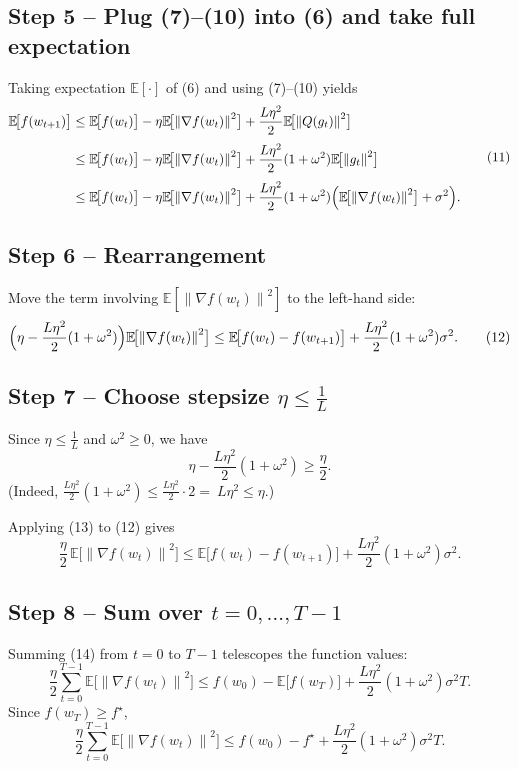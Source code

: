\documentclass{article}
\newcommand{\E}{\mathbb{E}}
\newcommand{\norm}[1]{\left\lVert#1\right\rVert}
\begin{document}
\subsection*{Step 5 – Plug (7)–(10) into (6) and take full expectation}
Taking expectation $\E[\cdot]$ of (6) and using (7)–(10) yields
\[
\begin{aligned}
\E\!\bigl[f(w_{t+1})\bigr]
&\le \E\!\bigl[f(w_{t})\bigr]
   -\eta\E\!\bigl[\norm{\nabla f(w_{t})}^{2}\bigr]
   +\frac{L\eta^{2}}{2}\E\!\bigl[\norm{Q(g_{t})}^{2}\bigr] \\[1mm]
&\le \E\!\bigl[f(w_{t})\bigr]
   -\eta\E\!\bigl[\norm{\nabla f(w_{t})}^{2}\bigr]
   +\frac{L\eta^{2}}{2}(1+\omega^{2})\E\!\bigl[\norm{g_{t}}^{2}\bigr] \\[1mm]
&\le \E\!\bigl[f(w_{t})\bigr]
   -\eta\E\!\bigl[\norm{\nabla f(w_{t})}^{2}\bigr]
   +\frac{L\eta^{2}}{2}(1+\omega^{2})\Bigl(\E\!\bigl[\norm{\nabla f(w_{t})}^{2}\bigr]+\sigma^{2}\Bigr).
\end{aligned}
\tag{11}
\]

\subsection*{Step 6 – Rearrangement}
Move the term involving $\E[\norm{\nabla f(w_{t})}^{2}]$ to the left-hand side:
\[
\Bigl(\eta-\frac{L\eta^{2}}{2}(1+\omega^{2})\Bigr)
\E\!\bigl[\norm{\nabla f(w_{t})}^{2}\bigr]
\le \E\!\bigl[f(w_{t})-f(w_{t+1})\bigr]
      +\frac{L\eta^{2}}{2}(1+\omega^{2})\sigma^{2}. \tag{12}
\]

\subsection*{Step 7 – Choose stepsize $\eta\le\frac{1}{L}$}
Since $\eta\le\frac{1}{L}$ and $\omega^{2}\ge0$, we have
\[
\eta-\frac{L\eta^{2}}{2}(1+\omega^{2})
\ge \frac{\eta}{2}. \tag{13}
\]
(Indeed, $\frac{L\eta^{2}}{2}(1+\omega^{2})\le\frac{L\eta^{2}}{2}\cdot2=\ L\eta^{2}\le\eta$.)

Applying (13) to (12) gives
\[
\frac{\eta}{2}\,\E\!\bigl[\norm{\nabla f(w_{t})}^{2}\bigr]
\le \E\!\bigl[f(w_{t})-f(w_{t+1})\bigr]
      +\frac{L\eta^{2}}{2}(1+\omega^{2})\sigma^{2}. \tag{14}
\]

\subsection*{Step 8 – Sum over $t=0,\dots,T-1$}
Summing (14) from $t=0$ to $T-1$ telescopes the function values:
\[
\frac{\eta}{2}\sum_{t=0}^{T-1}\E\!\bigl[\norm{\nabla f(w_{t})}^{2}\bigr]
\le f(w_{0})- \E\!\bigl[f(w_{T})\bigr] 
   + \frac{L\eta^{2}}{2}(1+\omega^{2})\sigma^{2}T. \tag{15}
\]
Since $f(w_{T})\ge f^{\star}$,
\[
\frac{\eta}{2}\sum_{t=0}^{T-1}\E\!\bigl[\norm{\nabla f(w_{t})}^{2}\bigr]
\le f(w_{0})-f^{\star}
   + \frac{L\eta^{2}}{2}(1+\omega^{2})\sigma^{2}T. \tag{16}
\]
\end{document}
